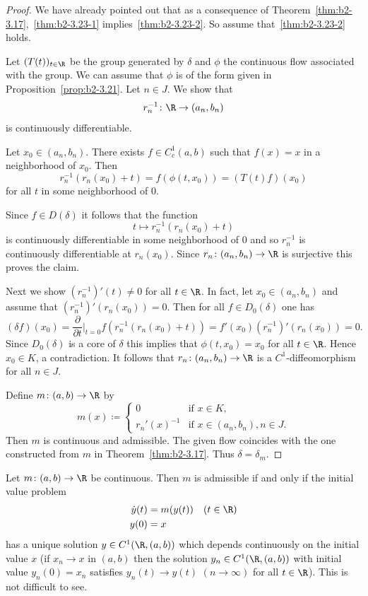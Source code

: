 \begin{proof}
We have already pointed out that as a consequence of Theorem~\ref{thm:b2-3.17},~\ref{thm:b2-3.23-1} implies~\ref{thm:b2-3.23-2}.
So assume that~\ref{thm:b2-3.23-2} holds.

Let $(T(t))_{t \in \R}$ be the group generated by $\delta$ and $\phi$ the continuous flow associated with the group.
We can assume that $\phi$ is of the form given in Proposition~\ref{prop:b2-3.21}.
Let $n \in J$.
We show that 
%
\[
	r_{n}^{-1} \colon \R \to (a_{n},b_{n})
\]
%
is continuously differentiable.

Let $x_{0} \in (a_{n},b_{n})$.
There exists $f \in C_{c}^{1}(a,b)$ such that $f(x) = x$ in a neighborhood of\/ $x_{0}$.
Then 
%
\[
	r_{n}^{-1}(r_{n}(x_{0}) + t) = f(\phi(t,x_{0})) = (T(t)f)(x_{0})
\]
%
for all $t$ in some neighborhood of\/ $0$.

Since $f \in D(\delta)$ it follows that the function 
%
\[
	t \mapsto r_{n}^{-1}(r_{n}(x_{0}) + t)
\]
%
is continuously differentiable in some neighborhood of\/ $0$ and so $r_{n}^{-1}$ is continuously differentiable at $r_{n}(x_{0})$.
Since $r_{n} \colon (a_{n},b_{n}) \to \R$ is surjective this proves the claim.

Next we show $(r_{n}^{-1})'(t) \neq 0$ for all $t \in \R$.
In fact, let $x_{0} \in (a_{n},b_{n})$ and assume that $(r_{n}^{-1})'(r_{n}(x_{0})) = 0$.
Then for all $f \in D_{0}(\delta)$ one has 
\[
(\delta f)(x_{0}) = \frac{\partial}{\partial t}\bigg|_{t=0} f(r_{n}^{-1}(r_{n}(x_{0}) + t)) = f'(x_{0})(r_{n}^{-1})'(r_{n}(x_{0})) = 0.
\]
Since $D_{0}(\delta)$ is a core of\/ $\delta$ this implies that $\phi(t,x_{0}) = x_{0}$ for all $t \in \R$.
Hence $x_{0} \in K$, a contradiction.
It follows that $r_{n} \colon (a_{n},b_{n}) \to \R$ is a $C^{1}$-diffeomorphism for all $n \in J$.

Define $m \colon (a,b) \to \R$ by
\begin{equation*}\label{eq:b2-m-def}
m(x) \coloneq \begin{cases}
    0 & \text{if } x \in K  ,\\
    r_{n}'(x)^{-1} & \text{if } x \in (a_{n},b_{n}), n \in J  .
\end{cases}
\end{equation*}
Then $m$ is continuous and admissible.
The given flow coincides with the one constructed from $m$ in Theorem~\ref{thm:b2-3.17}.
Thus $\delta = \delta_{m}$.
\end{proof}
\begin{remark*}\label{rem:b2-3.24}
%
Let $m \colon (a,b) \to \R$ be continuous.
Then $m$ is admissible if and only if the initial value problem
\begin{align*}
\dot{y}(t) &= m(y(t)) \quad (t \in \R) \\
y(0) &= x
\end{align*}
has a unique solution $y \in C^{1}(\R,(a,b))$ which depends continuously on the initial value $x$ (\ie  if\/ $x_{n} \to x$ in $(a,b)$ then the solution $y_{n} \in C^{1}(\R,(a,b))$ with initial value $y_{n}(0) = x_{n}$ satisfies $y_{n}(t) \to y(t)$ $(n \to \infty)$ for all $t \in \R$).
This is not difficult to see.
\end{remark*}
